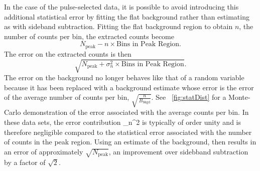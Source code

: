 In the case of the pulse-selected data, it is possible to avoid introducing this additional statistical error by fitting the flat background rather than estimating as with sideband subtraction.  Fitting the flat background region to obtain $n$, the number of counts per bin, the extracted counts become
\begin{equation}
N_{\text{peak}} - n\times\text{Bins in Peak Region}.
\end{equation}
The error on the extracted counts is then
\begin{equation}
\sqrt{N_{\text{peak}} + \sigma_n^2\times\text{Bins in Peak Region}}.
\end{equation}
The error on the background no longer behaves like that of a random variable because it has been replaced with a background estimate whose error is the error of the average number of counts per bin, $\sqrt{\frac{n}{B_{\text{bkgd}}}}$.  See \fig~\ref{fig:statDist} for a Monte-Carlo demonstration of the error associated with the average counts per bin.  In these data sets, the error contribution \sigma_n^2\times{} is typically of order unity and is therefore negligible compared to the statistical error associated with the number of counts in the peak region.  Using an estimate of the background, then results in an error of approximately $\sqrt{N_{\text{peak}}}$, an improvement over sidebband subtraction by a factor of $\sqrt{2}$.
